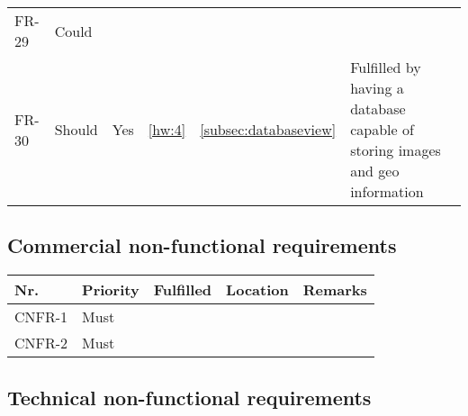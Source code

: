 \begin{table}[H]
\begin{tabular}{lllllL{0.5\textwidth}}
		FR-29 & Could    & ~        & ~         & ~         & ~         \\

		FR-30 & Should	 & Yes        & \ref{hw:4}         & \ref{subsec:databaseview} & Fulfilled by having a database capable of storing images and geo information\\
						
	\end{tabular}
\end{table}

	\subsection{Commercial non-functional requirements}
	\begin{table}[H]
	\begin{tabular}{lllll}
	
	Nr.    & Priority & Fulfilled & Location & Remarks \\ \hline
	
	CNFR-1 & Must     & ~        & ~         & ~       \\ 
	
	CNFR-2 & Must     & ~        & ~         & ~       \\
	
	\end{tabular}
	\end{table}
	
	\subsection{Technical non-functional requirements}
